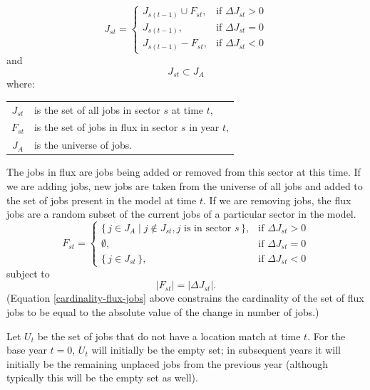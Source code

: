 \documentclass[fleqn]{article}
\begin{document}
\begin{equation}
J_{st} =
    \begin{cases}
        J_{s(t-1)} \cup F_{st}, &\text{if $\Delta J_{st} > 0$} \\
        J_{s(t-1)},             &\text{if $\Delta J_{st} = 0$}\\
        J_{s(t-1)} - F_{st},    &\text{if $\Delta J_{st} < 0$}
    \end{cases}
\end{equation}
and
\begin{equation}
J_{st} \subset J_{A}
\end{equation}
where:
\begin{center}
\begin{tabular}{c p{5.5in}}
$J_{st}$ & is the set of all jobs in sector $s$ at time $t$, \\
$F_{st}$ & is the set of jobs in flux in sector $s$ in year $t$, \\
$J_{A}$ & is the universe of jobs.\\
\end{tabular}
\end{center}

The jobs in flux are jobs being added or removed from this sector
at this time.  If we are adding jobs, new jobs are taken from the
universe of all jobs and added to the set of jobs present in the
model at time $t$.  If we are removing jobs, the flux jobs are a
random subset of the current jobs of a particular sector in the
model.
\begin{equation}
F_{st} =
    \begin{cases}
        \{\, j \in J_{A} \mid j \notin J_{st},
              j \mbox{ is in sector }s \,\}, &\text{if $\Delta J_{st} > 0$}\\
        \emptyset, &\text{if $\Delta J_{st} = 0$}\\
        \{\, j \in J_{st} \,\}, &\text{if $\Delta J_{st} < 0$}
    \end{cases}
\end{equation}
subject to
\begin{equation}
\label{cardinality-flux-jobs}
| F_{st} | = | \Delta J_{st} |.
\end{equation}
%
(Equation \ref{cardinality-flux-jobs} above constrains the cardinality of
the set of flux jobs to be equal to the absolute value of the change in
number of jobs.)

Let $U_t$ be the set of jobs that do not have a location match at
time $t$. For the base year $t=0$, $U_t$ will initially be the
empty set; in subsequent years it will initially be the remaining
unplaced jobs from the previous year (although typically this will
be the empty set as well).
\end{document}
